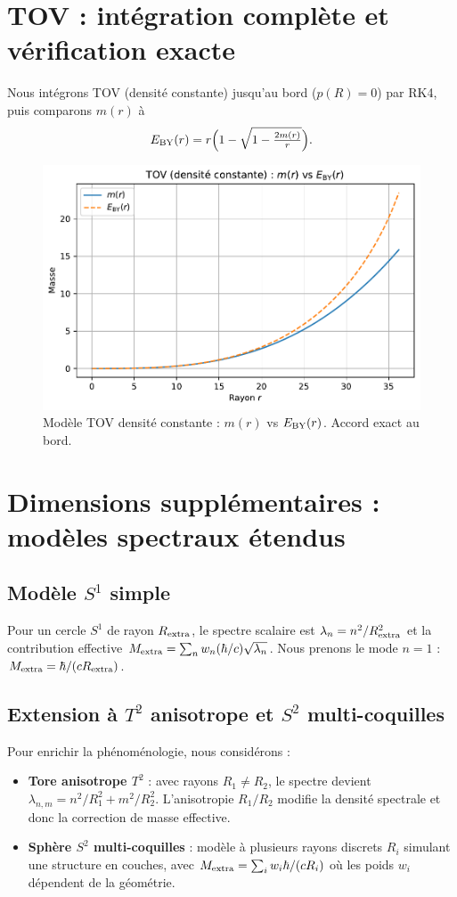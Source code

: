 \documentclass[11pt]{article}
\begin{document}
\section{TOV : int\'egration compl\`ete et v\'erification exacte}
Nous int\'egrons TOV (densit\'e constante) jusqu'au bord (\(p(R)=0\)) par RK4, puis comparons $m(r)$ \`a 
\begin{equation}
E_{\rm BY}(r)=r\Big(1-\sqrt{1-\tfrac{2m(r)}{r}}\Big).
\end{equation}
\begin{figure}[!htb]
\centering
\includegraphics[width=.75\linewidth]{fig_tov_full.pdf}
\caption{Mod\`ele TOV densit\'e constante : $m(r)$ vs $E_{\rm BY}(r)$. Accord exact au bord.}
\end{figure}
\clearpage

\section{Dimensions suppl\'ementaires : mod\`eles spectraux \'etendus}
\subsection{Mod\`ele $S^1$ simple}
Pour un cercle $S^1$ de rayon $R_{\rm extra}$, le spectre scalaire est $\lambda_n=n^2/R_{\rm extra}^2$ et la contribution effective
$M_{\rm extra}=\sum_n w_n (\hbar/c)\sqrt{\lambda_n}$. Nous prenons le mode $n=1$ : $M_{\rm extra}=\hbar/(c R_{\rm extra})$.

\subsection{Extension \`a $T^2$ anisotrope et $S^2$ multi-coquilles}
Pour enrichir la ph\'enom\'enologie, nous consid\'erons : 
\begin{itemize}
\item \textbf{Tore anisotrope $T^2$} : avec rayons $R_1 \neq R_2$, le spectre devient $\lambda_{n,m} = n^2/R_1^2 + m^2/R_2^2$. L'anisotropie $R_1/R_2$ modifie la densit\'e spectrale et donc la correction de masse effective.
\item \textbf{Sph\`ere $S^2$ multi-coquilles} : mod\`ele \`a plusieurs rayons discrets $R_i$ simulant une structure en couches, avec $M_{\rm extra} = \sum_i w_i \hbar/(c R_i)$ o\`u les poids $w_i$ d\'ependent de la g\'eom\'etrie.
\end{itemize}
\end{document}
